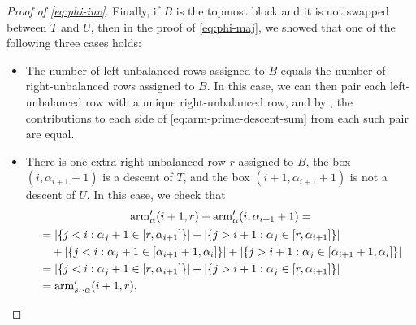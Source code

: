 \begin{proof}[Proof of \eqref{eq:phi-inv}]
    Finally, if \(B\) is the topmost block and it is not swapped between \(T\) and \(U\), then in the proof of \eqref{eq:phi-maj}, we showed that one of the following three cases holds:
    \begin{itemize}
        \item The number of left-unbalanced rows assigned to \(B\) equals the number of right-unbalanced rows assigned to \(B\).
        In this case, we can then pair each left-unbalanced row with a unique right-unbalanced row, and by , the contributions to each side of \eqref{eq:arm-prime-descent-sum} from each such pair are equal.
        \item There is one extra right-unbalanced row \(r\) assigned to \(B\), the box \((i, \alpha_{i+1} + 1)\) is a descent of \(T\), and the box \((i+1, \alpha_{i+1} + 1)\) is not a descent of \(U\).
        In this case, we check that
        \begin{multline*}
            \operatorname{arm}_{\alpha}'(i+1, r)
            +
            \operatorname{arm}_{\alpha}'(i, \alpha_{i+1} + 1)
            = \\
            \begin{aligned}
            &=
            \left|\{ j < i : \alpha_j + 1 \in [r, \alpha_{i+1}] \}\right| +
            \left|\{ j > i+1 : \alpha_j \in [r, \alpha_{i+1}] \}\right| \\
            &\quad+
            \left|\{ j < i : \alpha_j + 1 \in [\alpha_{i+1} + 1, \alpha_i] \}\right| +
            \left|\{ j > i+1 : \alpha_j \in [\alpha_{i+1} + 1, \alpha_i] \}\right| \\
            &=
            \left|\{ j < i : \alpha_j + 1 \in [r, \alpha_{i+1}] \}\right| +
            \left|\{ j > i+1 : \alpha_j \in [r, \alpha_{i+1}] \}\right| \\
            &=
            \operatorname{arm}_{s_i \cdot \alpha}'(i+1, r),
            \end{aligned}
        \end{multline*}

\end{itemize}
\end{proof}
